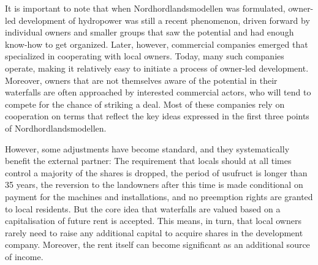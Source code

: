 It is important to note that when Nordhordlandsmodellen was formulated, owner-led development of hydropower was still a recent phenomenon, driven forward by individual owners and smaller groups that saw the potential and had enough know-how to get organized. Later, however, commercial companies emerged that specialized in cooperating with local owners. Today, many such companies operate, making it relatively easy to initiate a process of owner-led development. Moreover, owners that are not themselves aware of the potential in their waterfalls are often approached by interested commercial actors, who will tend to compete for the chance of striking a deal. Most of these companies rely on cooperation on terms that reflect the key ideas expressed in the first three points of Nordhordlandsmodellen.

However, some adjustments have become standard, and they systematically benefit the external partner: The requirement that locals should at all times control a majority of the shares is dropped, the period of usufruct is longer than 35 years, the reversion to the landowners after this time is made conditional on payment for the machines and installations, and no preemption rights are granted to local residents. But the core idea that waterfalls are valued based on a capitalisation of future rent is accepted. This means, in turn, that local owners rarely need to raise any additional capital to acquire shares in the development company. Moreover, the rent itself can become significant as an additional source of income. 

